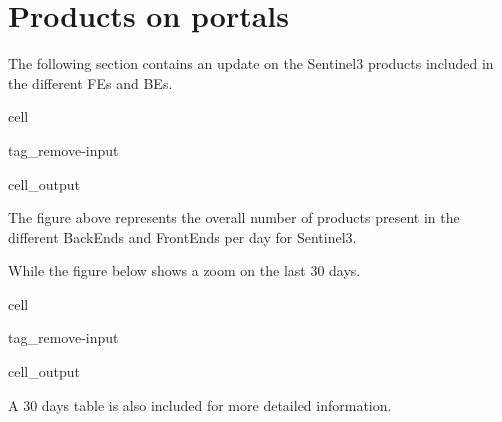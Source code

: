 \documentclass[letterpaper,10pt,english]{jupyterBook}
\begin{document}
\section{Products on portals}
\label{\detokenize{S3_portals:products-on-portals}}
\sphinxAtStartPar
The following section contains an update on the Sentinel\sphinxhyphen{}3 products included in the different FEs and BEs.

\begin{sphinxuseclass}{cell}
\begin{sphinxuseclass}{tag_remove-input}\begin{sphinxVerbatimOutput}

\begin{sphinxuseclass}{cell_output}
\noindent{}

\end{sphinxuseclass}\end{sphinxVerbatimOutput}

\end{sphinxuseclass}
\end{sphinxuseclass}
\sphinxAtStartPar
The figure above represents the overall number of products present in the different BackEnds and FrontEnds per day for Sentinel\sphinxhyphen{}3.

\sphinxAtStartPar
While the figure below shows a zoom on the last 30 days.

\begin{sphinxuseclass}{cell}
\begin{sphinxuseclass}{tag_remove-input}\begin{sphinxVerbatimOutput}

\begin{sphinxuseclass}{cell_output}
\noindent{}

\end{sphinxuseclass}\end{sphinxVerbatimOutput}

\end{sphinxuseclass}
\end{sphinxuseclass}
\sphinxAtStartPar
A 30 days table is also included for more detailed information.
\end{document}
